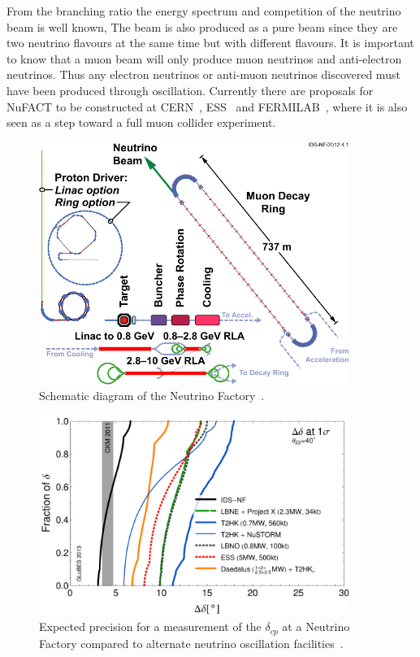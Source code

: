 {From the branching ratio the energy spectrum and competition of the neutrino beam is well known, The beam is also produced as a pure beam since they are two neutrino flavours at the same time but with different flavours. It is important to know that a muon beam will only produce muon neutrinos and anti-electron neutrinos. Thus any electron neutrinos or anti-muon neutrinos discovered must have been produced through oscillation. Currently there are proposals for NuFACT to be constructed at CERN~\cite{25NUfact}, ESS~\cite{ESS} and FERMILAB~\cite{NuFACTfermi}, where it is also seen as a step toward a full muon collider experiment.

\begin{figure}[h!]
\centering
\includegraphics[width=0.9\textwidth]{figures/131112-IDS-NF.pdf}
\caption{Schematic diagram of the Neutrino Factory~\cite{Fix7}.}
\label{fig:nuFact}
\end{figure}

\begin{figure}[h!]
\centering
\includegraphics[width=0.9\textwidth]{figures/rdr-cp-precision-comparison-131216.pdf}
\caption{Expected precision for a measurement of the $\delta_{cp}$ at a Neutrino Factory compared to alternate neutrino oscillation facilities~\cite{Fix7}.}
\label{fig:nuFactExp}
\end{figure}

}
